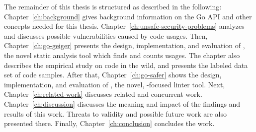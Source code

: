 The remainder of this thesis is structured as described in the following: Chapter~\ref{ch:background} gives background
information on the Go \unsafe{} \acrshort{API} and other concepts needed for this thesis.
Chapter~\ref{ch:unsafe-security-problems} analyzes and discusses possible vulnerabilities caused by \unsafe{} code
usages.
Then, Chapter~\ref{ch:go-geiger} presents the design, implementation, and evaluation of \toolGeiger, the novel static
analysis tool which finds and counts \unsafe{} usages.
The chapter also describes the empirical study on \unsafe{} code in the wild, and presents the labeled data set of
\unsafe{} code samples.
After that, Chapter~\ref{ch:go-safer} shows the design, implementation, and evaluation of \toolSafer, the novel,
\unsafe{}-focused linter tool.
Next, Chapter~\ref{ch:related-work} discusses related and concurrent work.
Chapter~\ref{ch:discussion} discusses the meaning and impact of the findings and results of this work.
Threats to validity and possible future work are also presented there.
Finally, Chapter~\ref{ch:conclusion} concludes the work.
